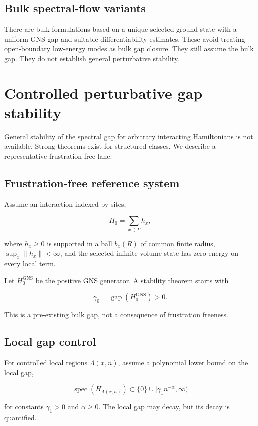 \documentclass[12pt]{article}
\theoremstyle{definition}
\theoremstyle{remark}
\newcommand{\spec}{\operatorname{spec}}
\begin{document}
\subsection{Bulk spectral-flow variants}

There are bulk formulations based on a unique selected ground state with a
uniform GNS gap and suitable differentiability estimates. These avoid treating
open-boundary low-energy modes as bulk gap closure. They still assume the
bulk gap. They do not establish general perturbative stability.

\section{Controlled perturbative gap stability}

General stability of the spectral gap for arbitrary interacting Hamiltonians
is not available. Strong theorems exist for structured classes. We describe a
representative frustration-free lane.

\subsection{Frustration-free reference system}

Assume an interaction indexed by sites,

\[
H_0=\sum_{x\in\Gamma}h_x,
\]

where $h_x\geq0$ is supported in a ball $b_x(R)$ of common finite radius,
$\sup_x\|h_x\|<\infty$, and the selected infinite-volume state has zero
energy on every local term.

Let $H_0^{\mathrm{GNS}}$ be the positive GNS generator. A stability theorem
starts with

\[
\gamma_0=\operatorname{gap}(H_0^{\mathrm{GNS}})>0.
\]

This is a pre-existing bulk gap, not a consequence of frustration freeness.

\subsection{Local gap control}

For controlled local regions $\Lambda(x,n)$, assume a polynomial lower bound
on the local gap,

\[
\spec(H_{\Lambda(x,n)})
\subset
\{0\}\cup[\gamma_1n^{-\alpha},\infty)
\]

for constants $\gamma_1>0$ and $\alpha\geq0$. The local gap may decay, but its
decay is quantified.
\end{document}
